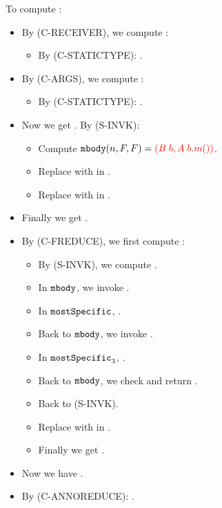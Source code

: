 To compute :
\begin{itemize}
	\item By (C-RECEIVER), we compute :
	\begin{itemize}
		\item By (C-STATICTYPE): .
	\end{itemize}
	\item By (C-ARGS), we compute :
	\begin{itemize}
		\item By (C-STATICTYPE): .
	\end{itemize}
	\item Now we get . By (S-INVK):
	\begin{itemize}
		\item Compute $\texttt{mbody}(n, F, F) = \textcolor{red}{(B \; b, A \; b.m())}$.
		\item Replace  with  in .
		\item Replace \red{$\kwthis$} with  in .
	\end{itemize}
	\item Finally we get .
	\item By (C-FREDUCE), we first compute :
	\begin{itemize}
		\item By (S-INVK), we compute .
		\item In $\texttt{mbody}$, we invoke .
		\item In $\texttt{mostSpecific}$, .
		\item Back to $\texttt{mbody}$, we invoke .
		\item In $\texttt{mostSpecific}_3$, .
		\item Back to $\texttt{mbody}$, we check  and return .
		\item Back to (S-INVK).
		\item Replace \red{$\kwthis$} with  in .
		\item Finally we get .
	\end{itemize}
	\item Now we have .
	\item By (C-ANNOREDUCE): .
\end{itemize}

